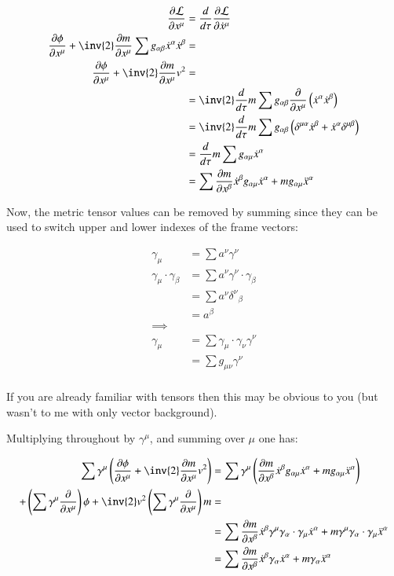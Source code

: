 \begin{align*}
\PD{x^{\mu}}{\LL} &= \frac{d}{d\tau} \PD{\xdot^{\mu}}{\LL} \\
\PD{x^{\mu}}{\phi} + \inv{2} \PD{x^{\mu}}{m} \sum g_{\alpha\beta} \xdot^{\alpha} \xdot^{\beta} &= \\
\PD{x^{\mu}}{\phi} + \inv{2} \PD{x^{\mu}}{m} v^2 &= \\
&= \inv{2} \frac{d}{d\tau} m \sum g_{\alpha\beta} \PD{x^{\mu}}{}\left(\xdot^{\alpha} \xdot^{\beta}\right) \\
&= \inv{2} \frac{d}{d\tau} m \sum g_{\alpha\beta} \left(\delta^{\mu\alpha} \xdot^{\beta} + \xdot^{\alpha} \delta^{\mu\beta}\right) \\
&= \frac{d}{d\tau} m \sum g_{\alpha\mu} \xdot^{\alpha} \\
&= \sum \PD{x^{\beta}}{m} \xdot^{\beta} g_{\alpha\mu} \xdot^{\alpha} + m g_{\alpha\mu} \xddot^{\alpha} \\
\end{align*}

Now, the metric tensor values can be removed by summing since they can be used to switch upper and lower indexes of the frame vectors:

\begin{align*}
\gamma_{\mu} &= \sum a^{\nu} \gamma^{\nu} \\
\gamma_{\mu} \cdot \gamma_{\beta}
&= \sum a^{\nu} \gamma^{\nu} \cdot \gamma_{\beta} \\
&= \sum a^{\nu} {\delta^{\nu}}_{\beta} \\
&= a^{\beta} \\
\implies \\
\gamma_{\mu}
&= \sum \gamma_{\mu} \cdot \gamma_{\nu} \gamma^{\nu} \\
&= \sum g_{\mu\nu} \gamma^{\nu} \\
\end{align*}

If you are already familiar with tensors then this may be obvious to you (but wasn't to me with only vector background).

Multiplying throughout by $\gamma^{\mu}$, and summing over $\mu$ one has:

\begin{align*}
\sum \gamma^{\mu} \left( \PD{x^{\mu}}{\phi} + \inv{2} \PD{x^{\mu}}{m} v^2 \right) 
&= \sum \gamma^{\mu} \left(\PD{x^{\beta}}{m} \xdot^{\beta} g_{\alpha\mu} \xdot^{\alpha} + m g_{\alpha\mu} \xddot^{\alpha} \right) \\
+ \left(\sum \gamma^{\mu} \PD{x^{\mu}}{}\right) \phi + \inv{2} v^2 \left(\sum \gamma^{\mu} \PD{x^{\mu}}{}\right) m &= \\
&= \sum \PD{x^{\beta}}{m} \xdot^{\beta} \gamma^{\mu} \gamma_{\alpha} \cdot \gamma_{\mu} \xdot^{\alpha} + m \gamma^{\mu} \gamma_{\alpha} \cdot \gamma_{\mu} \xddot^{\alpha}  \\
&= \sum \PD{x^{\beta}}{m} \xdot^{\beta} \gamma_{\alpha} \xdot^{\alpha} + m \gamma_{\alpha} \xddot^{\alpha}  \\
\end{align*}

